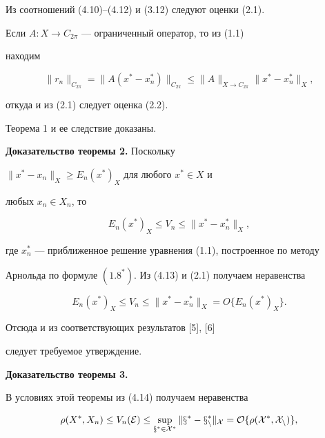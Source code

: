 Из соотношений (4.10)--(4.12) и (3.12) следуют оценки (2.1).





Если $A:X \to C_{2\pi}$ --- ограниченный оператор, то из (1.1)


находим


$$


\|r_n\|_{C_{2\pi}}=\|A(x^*-x^*_n)\|_{C_{2\pi}} \le \|A\|_{X \to C_{2\pi}}


\|x^*-x^*_n\|_X,


$$


откуда и из (2.1) следует оценка (2.2).


Теорема 1 и ее следствие доказаны.


\medskip





{\bf Доказательство теоремы 2.} Поскольку


$\|x^*-x_n\|_X \ge E_n(x^*)_X$ для любого $x^* \in X$ и


любых $x_n \in X_n$, то


\begin{equation}


E_n(x^*)_X \le V_n \le \|x^*-x^*_n\|_X,


\end{equation}


где $x^*_n$ --- приближенное решение уравнения (1.1), построенное по методу


Арнольда по формуле $(1.8^*)$. Из (4.13) и (2.1) получаем неравенства


\begin{equation}


E_n(x^*)_X \le V_n \le \|x^*-x^*_n\|_X=O\{E_n(x^*)_X\}.


\end{equation}


Отсюда и из соответствующих результатов [5], [6] 


следует требуемое утверждение.


\medskip





{\bf Доказательство теоремы 3.}


В условиях этой теоремы из (4.14) получаем неравенства


\begin{equation}


\rho(X^*,X_n)\le V_n(\rE) \le \sup_{x^* \in X^*}\|x^*-x^*_n\|_X


=O\{\rho(X^*, X_n)\},


\end{equation}


